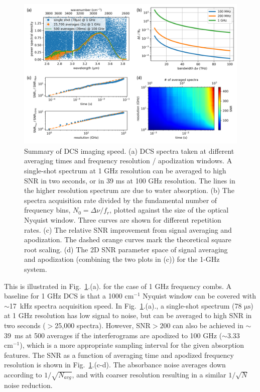 \documentclass[aip,reprint]{revtex4-1}
\begin{document}
\begin{figure}[!h]
    \centering
    \includegraphics[width=\linewidth]{snr_analysis_v4.png}
    \caption{Summary of DCS imaging speed. (a) DCS spectra taken at different averaging times and frequency resolution / apodization windows. A single-shot spectrum at 1 GHz resolution can be averaged to high SNR in two seconds, or in 39 ms at 100 GHz resolution. The lines in the higher resolution spectrum are due to water absorption. (b) The spectra acquisition rate divided by the fundamental number of frequency bins, $N_0=\Delta \nu / f_r$, plotted against the size of the optical Nyquist window. Three curves are shown for different repetition rates. (c) The relative SNR improvement from signal averaging and apodization. The dashed orange curves mark the theoretical square root scaling. (d) The 2D SNR parameter space of signal averaging and apodization (combining the two plots in (c)) for the 1-GHz system.}
    \label{fig:snr_analysis}
\end{figure}

This is illustrated in \mbox{Fig. \ref{fig:snr_analysis}.(a).} for the case of 1 GHz frequency combs. A baseline for 1 GHz DCS is that a 1000 $\mathrm{cm^{-1}}$ Nyquist window can be covered with \mbox{$\sim$17 kHz} spectra acquisition speed. In \mbox{Fig. \ref{fig:snr_analysis}.(a).}, a single-shot spectrum (78 $\mathrm{\mu s}$) at 1 GHz resolution has low signal to noise, but can be averaged to high SNR in two seconds ($>$25,000 spectra). However, \mbox{$\mathrm{SNR>200}$} can also be achieved in \mbox{$\sim$39 ms} at 500 averages if the interferograms are apodized to 100 GHz (\mbox{$\sim$3.33 $\mathrm{cm^{-1}}$}), which is a more appropriate sampling interval for the given absorption features. The SNR as a function of averaging time and apodized frequency resolution is shown in \mbox{Fig. \ref{fig:snr_analysis}.(c-d)}. The absorbance noise averages down according to $1/\sqrt{N_{avg}}$, and with coarser resolution resulting in a similar $1/\sqrt{N}$ noise reduction.
\end{document}
